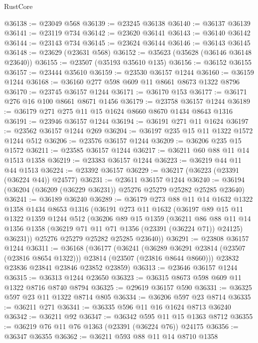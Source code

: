 \begin{lexlean}{RustCore}
\begin{coremodule}
@36138 := @23049 @568
@36139 := @23245 @36138
@36140 := @36137 @36139
@36141 := @23119 @734
@36142 := @23620 @36141
@36143 := @36140 @36142
@36144 := @23143 @734
@36145 := @23624 @36144
@36146 := @36143 @36145
@36148 := @23629 (@23631 @568)
@36152 := @35623 (@35628 (@36146 @36148 @23640))
@36155 := @23507 (@35193 @35610 @135)
@36156 := @36152 @36155
@36157 := @23444 @35610
@36159 := @23530 @36157 @1244
@36160 := @36159 @1244
@36168 := @36160 @277 @598 @609 @11 @8661 @8673 @1322 @8796
@36170 := @23745 @36157 @1244
@36171 := @36170 @153
@36177 := @36171 @276 @16 @100 @8661 @8671 @1456
@36179 := @23758 @36157 @1244
@36189 := @36179 @271 @275 @11 @15 @1624 @8660 @8670 @1434 @8643 @1316
@36191 := @23946 @36157 @1244
@36194 := @36191 @271 @11 @1624
@36197 := @23562 @36157 @1244 @269
@36204 := @36197 @235 @15 @11 @1322 @1572 @1244 @512
@36206 := @23576 @36157 @1244
@36209 := @36206 @235 @15 @1572
@36211 := @23585 @36157 @1244
@36217 := @36211 @60 @88 @11 @14 @1513 @1358
@36219 := @23383 @36157 @1244
@36223 := @36219 @44 @11 @44 @1513
@36224 := @23392 @36157
@36229 := @36217 (@36223 (@23391 (@36224 @44)) @24577)
@36231 := @23611 @36157 @1244
@36240 := @36194 (@36204 (@36209 (@36229 @36231)) @25276 @25279 @25282 @25285 @23640)
@36241 := @36189 @36240
@36289 := @36179
    @273
    @88
    @11
    @14
    @1632
    @1322
    @1358
    @1434
    @8653
    @1316
    (@36191
      @273
      @11
      @1632
      (@36197
        @89
        @15
        @11
        @1322
        @1359
        @1244
        @512
        (@36206
          @89
          @15
          @1359
          (@36211
            @86
            @88
            @11
            @14
            @1356
            @1358
            (@36219 @71 @11 @71 @1356 (@23391 (@36224 @71)) @24125)
            @36231))
        @25276
        @25279
        @25282
        @25285
        @23640))
@36291 := @23808 @36157 @1244
@36311 := @36168
    (@36177
      (@36241
        (@36289 @36291 @23814 (@23507 (@23816 @8654 @1322)))
        @23814
        (@23507 (@23816 @8644 @8660)))
      @23832
      @23836
      @23841
      @23846
      @23852
      @23859)
@36313 := @23646 @36157 @1244
@36315 := @36313 @1244 @23650
@36323 := @36315 @8673 @598 @609 @11 @1322 @8716 @8740 @8794
@36325 := @29619 @36157 @590
@36331 := @36325 @597 @23 @11 @1322 @8714 @805
@36334 := @36206 @597 @23 @8714
@36335 := @36211 @271
@36341 := @36335 @596 @11 @16 @1624 @8713 @36240
@36342 := @36211 @92
@36347 := @36342 @595 @11 @15 @1363 @8712
@36355 := @36219 @76 @11 @76 @1363 (@23391 (@36224 @76)) @24175
@36356 := @36347 @36355
@36362 := @36211 @593 @88 @11 @14 @8710 @1358

\end{coremodule}
\end{lexlean}
